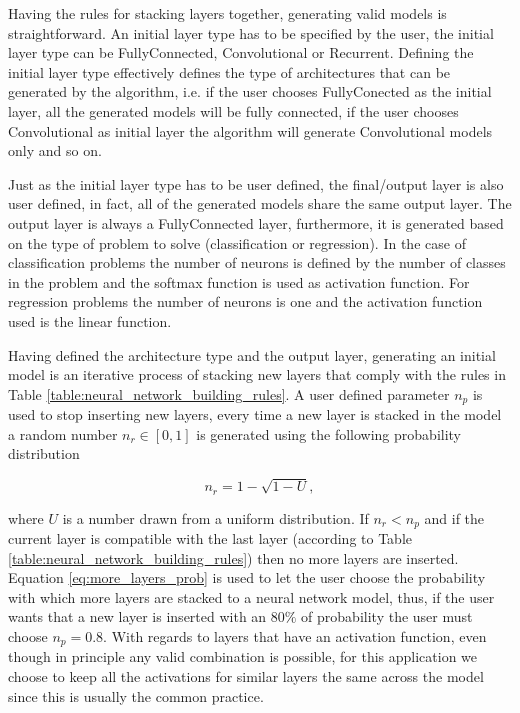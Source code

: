 \documentclass[journal]{IEEEtran}
\begin{document}
Having the rules for stacking layers together, generating valid models is straightforward. An initial layer type has to be specified by the user, the initial layer type can be FullyConnected, Convolutional or Recurrent. Defining the initial layer type effectively defines the type of architectures that can be generated by the algorithm, i.e. if the user chooses FullyConected as the initial layer, all the generated models will be fully connected, if the user chooses Convolutional as initial layer the algorithm will generate Convolutional models only and so on.

Just as the initial layer type has to be user defined, the final/output layer is also user defined, in fact, all of the generated models share the same output layer. The output layer is always a FullyConnected layer, furthermore, it is generated based on the type of problem to solve (classification or regression). In the case of classification problems the number of neurons is defined by the number of classes in the problem and the softmax function is used as activation function. For regression problems the number of neurons is one and the activation function used is the linear function.

Having defined the architecture type and the output layer, generating an initial model is an iterative process of stacking new layers that comply with the rules in Table \ref{table:neural_network_building_rules}. A user defined parameter $n_p$ is used to stop inserting new layers, every time a new layer is stacked in the model a random number $n_r \in \left[0,1\right]$ is generated using the following probability distribution

\begin{equation}
n_r = 1 - \sqrt{1 - U},
\label{eq:more_layers_prob}
\end{equation}

where $U$ is a number drawn from a uniform distribution. If $n_r < n_p$ and if the current layer is compatible with the last layer (according to Table \ref{table:neural_network_building_rules}) then no more layers are inserted. Equation \ref{eq:more_layers_prob} is used to let the user choose the probability with which more layers are stacked to a neural network model, thus, if the user wants that a new layer is inserted with an $80\%$ of probability the user must choose $n_p = 0.8$. With regards to layers that have an activation function, even though in principle any valid combination is possible, for this application we choose to keep all the activations for similar layers the same across the model since this is usually the common practice. 
\end{document}
